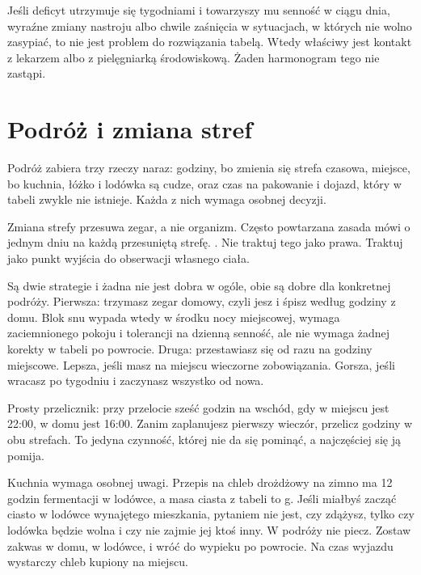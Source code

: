\begin{uwaga}
Jeśli deficyt utrzymuje się tygodniami i towarzyszy mu senność w ciągu dnia, wyraźne zmiany nastroju albo chwile zaśnięcia w sytuacjach, w których nie wolno zasypiać, to nie jest problem do rozwiązania tabelą. Wtedy właściwy jest kontakt z lekarzem albo z pielęgniarką środowiskową. Żaden harmonogram tego nie zastąpi.
\end{uwaga}

\section{Podróż i zmiana stref}

Podróż zabiera trzy rzeczy naraz: godziny, bo zmienia się strefa czasowa, miejsce, bo kuchnia, łóżko i lodówka są cudze, oraz czas na pakowanie i dojazd, który w tabeli zwykle nie istnieje. Każda z nich wymaga osobnej decyzji.

Zmiana strefy przesuwa zegar, a nie organizm. Często powtarzana zasada mówi o jednym dniu na każdą przesuniętą strefę. . Nie traktuj tego jako prawa. Traktuj jako punkt wyjścia do obserwacji własnego ciała.

Są dwie strategie i żadna nie jest dobra w ogóle, obie są dobre dla konkretnej podróży. Pierwsza: trzymasz zegar domowy, czyli jesz i śpisz według godziny z domu. Blok snu wypada wtedy w środku nocy miejscowej, wymaga zaciemnionego pokoju i tolerancji na dzienną senność, ale nie wymaga żadnej korekty w tabeli po powrocie. Druga: przestawiasz się od razu na godziny miejscowe. Lepsza, jeśli masz na miejscu wieczorne zobowiązania. Gorsza, jeśli wracasz po tygodniu i zaczynasz wszystko od nowa.

Prosty przelicznik: przy przelocie sześć godzin na wschód, gdy w miejscu jest 22:00, w domu jest 16:00. Zanim zaplanujesz pierwszy wieczór, przelicz godziny w obu strefach. To jedyna czynność, której nie da się pominąć, a najczęściej się ją pomija.

Kuchnia wymaga osobnej uwagi. Przepis na chleb drożdżowy na zimno ma 12 godzin fermentacji w lodówce, a masa ciasta z tabeli to  g. Jeśli miałbyś zacząć ciasto w lodówce wynajętego mieszkania, pytaniem nie jest, czy zdążysz, tylko czy lodówka będzie wolna i czy nie zajmie jej ktoś inny. W podróży nie piecz. Zostaw zakwas w domu, w lodówce, i wróć do wypieku po powrocie. Na czas wyjazdu wystarczy chleb kupiony na miejscu.

